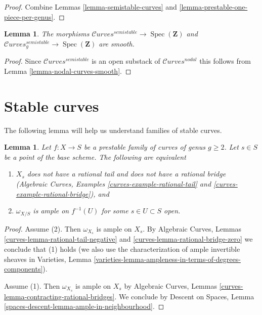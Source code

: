 \documentclass{stacks-project}
\theoremstyle{plain}
\newtheorem{lemma}[subsection]{Lemma}
\theoremstyle{definition}
\theoremstyle{remark}
\numberwithin{equation}{subsection}
\def\Spec{\mathop{\mathrm{Spec}}}
\def\Curvesstack{\mathcal{C}\!\mathit{urves}}
\begin{document}
\begin{proof}
Combine Lemmas \ref{lemma-semistable-curves} and
\ref{lemma-prestable-one-piece-per-genus}.
\end{proof}

\begin{lemma}
\label{lemma-semistable-curves-smooth}
The morphisms
$\Curvesstack^{semistable} \to \Spec(\mathbf{Z})$ and
$\Curvesstack^{semistable}_g \to \Spec(\mathbf{Z})$
are smooth.
\end{lemma}

\begin{proof}
Since $\Curvesstack^{semistable}$ is an open substack of
$\Curvesstack^{nodal}$ this follows from
Lemma \ref{lemma-nodal-curves-smooth}.
\end{proof}







\section{Stable curves}
\label{section-stable-curves}

\noindent
The following lemma will help us understand families of stable curves.

\begin{lemma}
\label{lemma-stable}
Let $f : X \to S$ be a prestable family of curves of genus $g \geq 2$.
Let $s \in S$ be a point of the base scheme.
The following are equivalent
\begin{enumerate}
\item $X_s$ does not have a rational tail and does not have a
rational bridge
(Algebraic Curves, Examples
\ref{curves-example-rational-tail} and
\ref{curves-example-rational-bridge}), and
\item $\omega_{X/S}$ is ample on $f^{-1}(U)$ for some $s \in U \subset S$ open.
\end{enumerate}
\end{lemma}

\begin{proof}
Assume (2). Then $\omega_{X_s}$ is ample on $X_s$.
By Algebraic Curves, Lemmas \ref{curves-lemma-rational-tail-negative} and
\ref{curves-lemma-rational-bridge-zero}
we conclude that (1) holds (we also
use the characterization of ample invertible sheaves
in Varieties, Lemma
\ref{varieties-lemma-ampleness-in-terms-of-degrees-components}).

\medskip\noindent
Assume (1). Then $\omega_{X_s}$ is ample on $X_s$ by
Algebraic Curves, Lemmas \ref{curves-lemma-contracting-rational-bridges}.
We conclude by Descent on Spaces, Lemma
\ref{spaces-descent-lemma-ample-in-neighbourhood}.
\end{proof}
\end{document}
